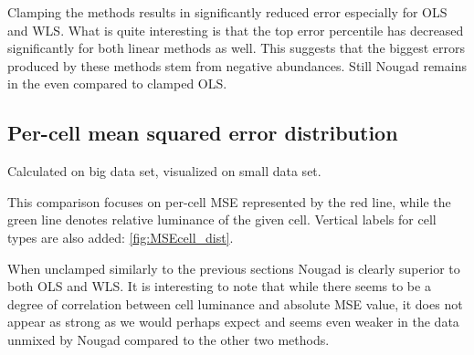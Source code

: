 Clamping the methods results in significantly reduced error especially for OLS and WLS. What is quite interesting is that the top error percentile has decreased significantly for both linear methods as well. This suggests that the biggest errors produced by these methods stem from negative abundances. Still Nougad remains in the even compared to clamped OLS.

\subsection{Per-cell mean squared error distribution}

Calculated on big data set, visualized on small data set.

This comparison focuses on per-cell MSE represented by the red line, while the green line denotes relative luminance of the given cell. Vertical labels for cell types are also added: \cref{fig:MSEcell_dist}.

When unclamped similarly to the previous sections Nougad is clearly superior to both OLS and WLS. It is interesting to note that while there seems to be a degree of correlation between cell luminance and absolute MSE value, it does not appear as strong as we would perhaps expect and seems even weaker in the data unmixed by Nougad compared to the other two methods.

